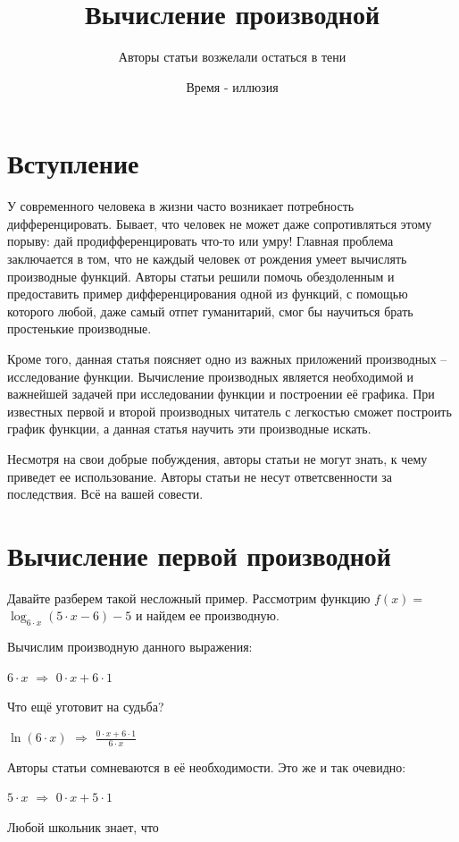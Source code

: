 \documentclass{article}
\title{Вычисление производной}
\author{Авторы статьи возжелали остаться в тени}
\date{Время - иллюзия}
\begin{document}
\maketitle

\section{Вступление}

У современного человека в жизни часто возникает потребность дифференцировать. Бывает, что человек не может даже сопротивляться этому порыву: дай продифференцировать что-то или умру! Главная проблема заключается в том, что не каждый человек от рождения умеет вычислять производные функций. Авторы статьи решили помочь обездоленным и предоставить пример дифференцирования одной из функций, с помощью которого любой, даже самый отпет гуманитарий, смог бы научиться брать простенькие производные.

Кроме того, данная статья поясняет одно из важных приложений производных -- исследование функции. Вычисление производных является необходимой и важнейшей задачей при исследовании функции и построении её графика. При известных первой и второй производных читатель с легкостью сможет построить график функции, а данная статья научить эти производные искать.

Несмотря на свои добрые побуждения, авторы статьи не могут знать, к чему приведет ее использование. Авторы статьи не несут ответсвенности за последствия. Всё на вашей совести.

\section{Вычисление первой производной}

Давайте разберем такой несложный пример. Рассмотрим функцию $f(x) = $ $\log_{6 \cdot x}(5 \cdot x - 6) - 5$ и найдем ее производную.

Вычислим производную данного выражения:

$6 \cdot x$ $\Rightarrow$ $0 \cdot x + 6 \cdot 1$

Что ещё уготовит на судьба?

$ \ln (6 \cdot x)$ $\Rightarrow$ $\frac{0 \cdot x + 6 \cdot 1}{6 \cdot x}$

Авторы статьи сомневаются в её необходимости. Это же и так очевидно:

$5 \cdot x$ $\Rightarrow$ $0 \cdot x + 5 \cdot 1$

Любой школьник знает, что
\end{document}
